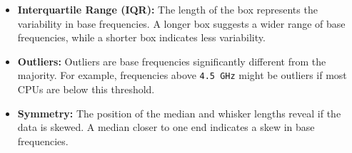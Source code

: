 \documentclass{article}
\begin{document}
\begin{itemize}
\begin{itemize}
\begin{itemize}
				\item \textbf{Interquartile Range (IQR):} The length of the box represents the variability in base frequencies. A longer box suggests a wider range of base frequencies, while a shorter box indicates less variability.
				\item \textbf{Outliers:} Outliers are base frequencies significantly different from the majority. For example, frequencies above \texttt{4.5 GHz} might be outliers if most CPUs are below this threshold.
				\item \textbf{Symmetry:} The position of the median and whisker lengths reveal if the data is skewed. A median closer to one end indicates a skew in base frequencies.
			\end{itemize}
		\end{itemize}
	\end{itemize}
	
\end{document}
